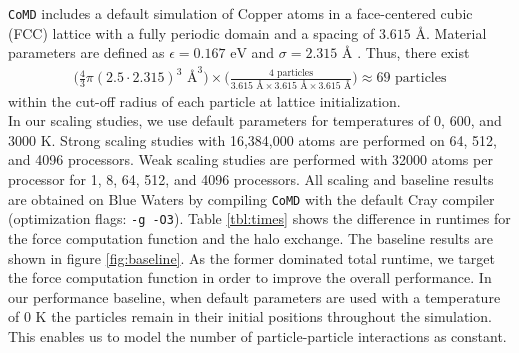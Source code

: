 \documentclass[12pt]{article}
\begin{document}
\texttt{CoMD} includes a default simulation of Copper atoms in a face-centered 
cubic (FCC) lattice with a fully periodic domain and a spacing of $3.615 \text{ \AA}$.
Material parameters are defined as $\epsilon = 0.167 \text{ eV}$ and $\sigma = 2.315 \text{ \AA}$ 
\cite{CoMD}. Thus, there exist
\begin{align}
     \bigg( \frac{4}{3} \pi (2.5 \cdot 2.315)^3 \text{ \AA}^3 \bigg) \times
     \bigg( \frac{4 \text{ particles}}{3.615 \text{ \AA} \times 3.615 \text{ \AA} \times 3.615 \text{ \AA}} \bigg)
     \approx 69 \text{ particles}
\end{align}
within the cut-off radius of each particle at lattice initialization. \\

In our scaling studies, we use default parameters for temperatures of
0, 600, and 3000 K. Strong scaling studies with 16,384,000 atoms are
performed on 64, 512, and 4096 processors. Weak scaling studies are
performed with 32000 atoms per processor for 1, 8, 64, 512, and 4096
processors.  All scaling and baseline results are obtained on Blue
Waters by compiling \texttt{CoMD} with the default Cray compiler
(optimization flags: \texttt{-g -O3}). Table \ref{tbl:times} shows the
difference in runtimes for the force computation function and the halo
exchange. The baseline results are shown in figure
\ref{fig:baseline}. As the former dominated total runtime, we target
the force computation function in order to improve the overall
performance. In our performance baseline, when default parameters are
used with a temperature of 0 K the particles remain in their initial
positions throughout the simulation.  This enables us to model the
number of particle-particle interactions as constant.
\\
\end{document}
